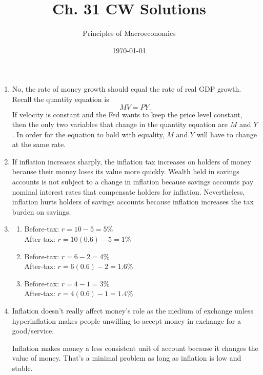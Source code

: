 \documentclass{article}
\title{Ch. 31 CW Solutions}
\author{Principles of Macroeconomics}
\date{\today}
\begin{document}
\maketitle

\begin{enumerate}

\item No, the rate of money growth should equal the rate of real GDP growth. Recall the quantity equation is \[MV = PY.\] If velocity is constant and the Fed wants to keep the price level constant, then the only two variables that change in the quantity equation are $M$ and $Y$. In order for the equation to hold with equality, $M$ and $Y$ will have to change at the same rate.

\item If inflation increases sharply, the inflation tax increases on holders of money because their money loses its value more quickly. Wealth held in savings accounts is not subject to a change in inflation because savings accounts pay nominal interest rates that compensate holders for inflation. Nevertheless, inflation hurts holders of savings accounts because inflation increases the tax burden on savings.

\item

	\begin{enumerate}
	
	\item Before-tax: $r = 10 - 5 = 5\%$ \\
		After-tax: $r = 10(0.6) - 5 = 1\%$
		
	\item Before-tax: $r = 6 - 2 = 4\%$ \\
		After-tax: $r = 6(0.6) - 2 = 1.6\%$
		
	\item Before-tax: $r = 4 - 1 = 3\%$ \\
		After-tax: $r = 4(0.6) -1 = 1.4\%$
	
	\end{enumerate}
	
\item Inflation doesn't really affect money's role as the medium of exchange unless hyperinflation makes people unwilling to accept money in exchange for a good/service.

Inflation makes money a less consistent unit of account because it changes the value of money. That's a minimal problem as long as inflation is low and stable. 


\end{enumerate}
\end{document}
